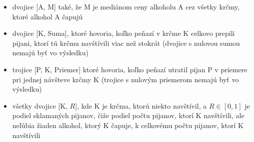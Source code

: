 \documentclass[10pt, a4paper]{article}
\theoremstyle{definition}
\begin{document}
\begin{enumerate}
\begin{itemize}
    \item dvojice [A, M] také, že M je mediánom ceny alkoholu A cez všetky krčmy, ktoré alkohol A čapujú
    \item dvojice [K, Suma], ktoré hovoria, koľko peňazí v krčme K celkovo prepili pijani, ktorí tú krčmu navštívili viac než stokrát (dvojice s nulovou sumou nemajú byť vo výsledku)
    \item trojice [P, K, Priemer] ktoré hovoria, koľko peňazí utratil pijan P v priemere pri jednej návšteve krčmy K (trojice s nulovým priemerom nemajú byť vo výsledku)
    \item všetky dvojice [K, $R$], kde K je krčma, ktorú niekto navštívil,
        a $R\in [0,1]$ je podiel sklamaných pijanov, čiže podiel počtu pijanov, ktorí K navštívili, ale neľúbia žiaden alkohol, ktorý K čapuje,
        k celkovému počtu pijanov, ktorí K navštívili
\end{itemize}

\end{enumerate}
\end{document}
